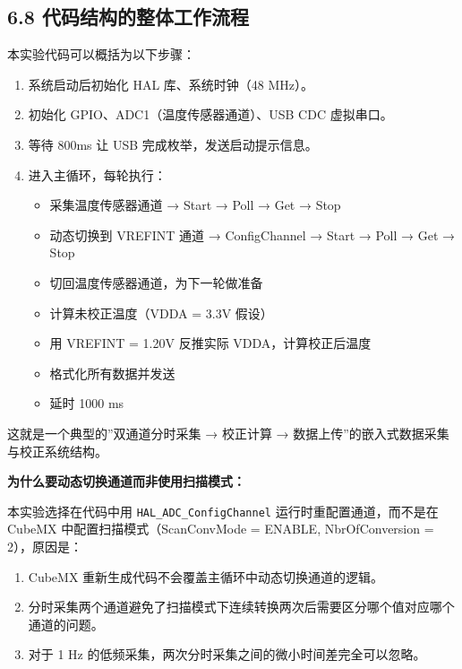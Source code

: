 \documentclass[
  chinese,
  UTF8,
  oneside,
  openany]{ctexbook}
\providecommand{\tightlist}{%
  \setlength{\itemsep}{0pt}\setlength{\parskip}{0pt}}
\begin{document}
\subsection{6.8
代码结构的整体工作流程}\label{ux4ee3ux7801ux7ed3ux6784ux7684ux6574ux4f53ux5de5ux4f5cux6d41ux7a0b-1}

本实验代码可以概括为以下步骤：

\begin{enumerate}
\def\labelenumi{\arabic{enumi}.}
\tightlist
\item
  系统启动后初始化 HAL 库、系统时钟（48 MHz）。
\item
  初始化 GPIO、ADC1（温度传感器通道）、USB CDC 虚拟串口。
\item
  等待 800ms 让 USB 完成枚举，发送启动提示信息。
\item
  进入主循环，每轮执行：

  \begin{itemize}
  \tightlist
  \item
    采集温度传感器通道 → Start → Poll → Get → Stop
  \item
    动态切换到 VREFINT 通道 → ConfigChannel → Start → Poll → Get → Stop
  \item
    切回温度传感器通道，为下一轮做准备
  \item
    计算未校正温度（VDDA = 3.3V 假设）
  \item
    用 VREFINT = 1.20V 反推实际 VDDA，计算校正后温度
  \item
    格式化所有数据并发送
  \item
    延时 1000 ms
  \end{itemize}
\end{enumerate}

这就是一个典型的''双通道分时采集 → 校正计算 →
数据上传''的嵌入式数据采集与校正系统结构。

\textbf{为什么要动态切换通道而非使用扫描模式：}

本实验选择在代码中用 \texttt{HAL\_ADC\_ConfigChannel}
运行时重配置通道，而不是在 CubeMX 中配置扫描模式（ScanConvMode = ENABLE,
NbrOfConversion = 2），原因是：

\begin{enumerate}
\def\labelenumi{\arabic{enumi}.}
\tightlist
\item
  CubeMX 重新生成代码不会覆盖主循环中动态切换通道的逻辑。
\item
  分时采集两个通道避免了扫描模式下连续转换两次后需要区分哪个值对应哪个通道的问题。
\item
  对于 1 Hz 的低频采集，两次分时采集之间的微小时间差完全可以忽略。
\end{enumerate}
\end{document}
